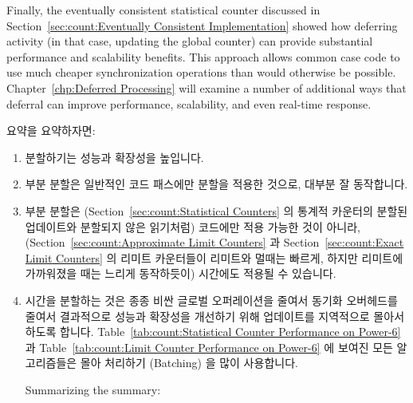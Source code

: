 Finally, the eventually consistent statistical counter discussed in
Section~\ref{sec:count:Eventually Consistent Implementation}
showed how deferring activity (in that case, updating the global
counter) can provide substantial performance and scalability benefits.
This approach allows common case code to use much cheaper synchronization
operations than would otherwise be possible.
Chapter~\ref{chp:Deferred Processing} will examine a number of additional
ways that deferral can improve performance, scalability, and even
real-time response.
\fi

요약을 요약하자면:

\begin{enumerate}
\item	분할하기는 성능과 확장성을 높입니다.
\item	부분 분할은 일반적인 코드 패스에만 분할을 적용한 것으로, 대부분 잘
	동작합니다.
\item	부분 분할은 (Section~\ref{sec:count:Statistical Counters} 의 통계적
	카운터의 분할된 업데이트와 분할되지 않은 읽기처럼) 코드에만 적용 가능한
	것이 아니라, (Section~\ref{sec:count:Approximate Limit Counters} 과
	Section~\ref{sec:count:Exact Limit Counters} 의 리미트 카운터들이
	리미트와 멀때는 빠르게, 하지만 리미트에 가까워졌을 때는 느리게
	동작하듯이) 시간에도 적용될 수 있습니다.
\item	시간을 분할하는 것은 종종 비싼 글로벌 오퍼레이션을 줄여서 동기화
	오버헤드를 줄여서 결과적으로 성능과 확장성을 개선하기 위해 업데이트를
	지역적으로 몰아서 하도록 합니다.
	Table~\ref{tab:count:Statistical Counter Performance on Power-6} 과
	Table~\ref{tab:count:Limit Counter Performance on Power-6} 에 보여진
	모든 알고리즘들은 몰아 처리하기 (Batching) 을 많이 사용합니다.
\iffalse

Summarizing the summary:


\end{enumerate}
